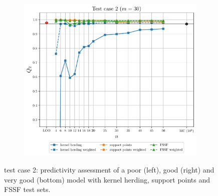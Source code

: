 \begin{figure}
\begin{subfigure}[b]{0.49\linewidth}
  \end{subfigure}
  \centering
  \begin{subfigure}[b]{0.49\linewidth}
    \centering
    \includegraphics[width=\linewidth]{./part2/figures/SIS/cosin_learnsize_30.pdf}
  \end{subfigure}
  \caption{test case 2: predictivity assessment of a poor (left), good (right) and very good (bottom) model with kernel herding, support points and FSSF test sets.}
  \label{fig:cosin_benchmark}
\end{figure}

